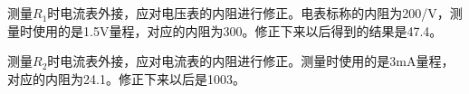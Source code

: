 \documentclass[UTF8]{ctexart}
\begin{document}
\begin{figure}
\centering
{}
 \\
 \\
\end{figure}

测量$R_1$时电流表外接，应对电压表的内阻进行修正。电表标称的内阻为200\ohm/V，测量时使用的是1.5V量程，对应的内阻为300\ohm 。修正下来以后得到的结果是47.4\ohm 。

测量$R_2$时电流表外接，应对电流表的内阻进行修正。测量时使用的是3mA量程，对应的内阻为24.1\ohm 。修正下来以后是1003\ohm 。
\end{document}
